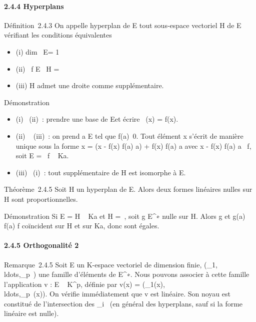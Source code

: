 \documentclass[]{article}
\begin{document}
\paragraph{2.4.4 Hyperplans}

Définition~2.4.3 On appelle hyperplan de E tout sous-espace vectoriel H
de E vérifiant les conditions équivalentes

\begin{itemize}
\itemsep1pt\parskip0pt
\item
  (i) dim~ E\diagupH = 1
\item
  (ii) \exists~f \in E
  \diagdown\0\, H =\
  \mathrmKerf
\item
  (iii) H admet une droite comme supplémentaire.
\end{itemize}

Démonstration

\begin{itemize}
\itemsep1pt\parskip0pt
\item
  (i) \rigtharrow~(ii)~: prendre \overlinee une base de E\diagupH et
  écrire \pi~(x) = f(x)\overlinee.
\item
  (ii) \rigtharrow~ (iii)~: on prend a \in E tel que
  f(a)\neq~0. Tout élément x s'écrit de manière
  unique sous la forme x = (x - f(x) \over f(a) a)
  + f(x) \over f(a) a avec x - f(x)
  \over f(a) a
  \in\mathrmKer~f, soit E
  = \mathrmKer~f \oplus~ Ka.
\item
  (iii) \rigtharrow~(i)~: tout supplémentaire de H est isomorphe à E\diagupH.
\end{itemize}

Théorème~2.4.5 Soit H un hyperplan de E. Alors deux formes linéaires
nulles sur H sont proportionnelles.

Démonstration Si E = H \oplus~ Ka et H =\
\mathrmKerf, soit g \in E^∗ nulle sur H.
Alors g et  g(a) \over f(a) f coïncident sur H et sur
Ka, donc sont égales.

\paragraph{2.4.5 Orthogonalité 2}

Remarque~2.4.5 Soit E un K-espace vectoriel de dimension finie,
(\phi_1,\\ldots,\phi_p~)
une famille d'éléments de E^∗. Nous pouvons associer à cette
famille l'application v : E \rightarrow~ K^p, définie par v(x) =
(\phi_1(x),\\ldots,\phi_p~(x)).
On vérifie immédiatement que v est linéaire. Son noyau est constitué de
l'intersection des
\mathrmKer\phi_i~ (en
général des hyperplans, sauf si la forme linéaire est nulle).
\end{document}
